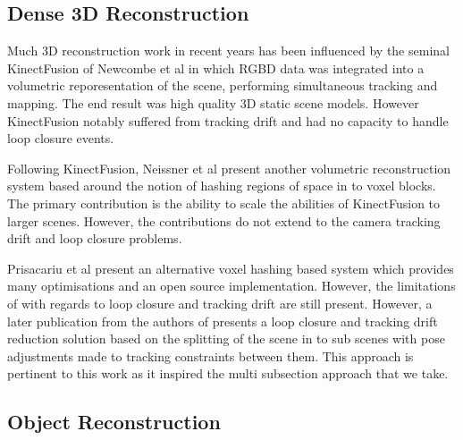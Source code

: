 \subsection{Dense 3D Reconstruction}
Much 3D reconstruction work in recent years has been influenced by the seminal KinectFusion\cite{Newcombe2011} of Newcombe et al in which
RGBD data was integrated into a volumetric reporesentation  of the scene, performing simultaneous tracking and mapping. The end result was
high quality 3D static scene models.  However KinectFusion notably suffered from tracking drift and had no capacity to handle loop closure
events.

Following KinectFusion, Neissner et al  present another volumetric reconstruction system\cite{Niessner2013} based around the notion of
hashing regions of space in to voxel blocks.  The primary contribution is the ability to scale the abilities of KinectFusion to larger
scenes. However, the contributions do not extend to the camera tracking drift and loop closure problems.

Prisacariu et al present an alternative voxel hashing based system\cite{Prisacariu2014} which provides many optimisations and an open source 
implementation. However, the limitations of\cite{Newcombe2011,Niessner2013} with regards to loop closure and tracking drift are still present. 
However, a later publication\cite{Kahler2016} from the authors of\cite{Prisacariu2014} presents a loop closure and tracking drift reduction 
solution based on the splitting of the scene in to sub scenes with pose adjustments made to tracking constraints between them. This approach 
is pertinent to this work as it inspired the multi subsection approach that we take. 


\subsection{Object Reconstruction}

